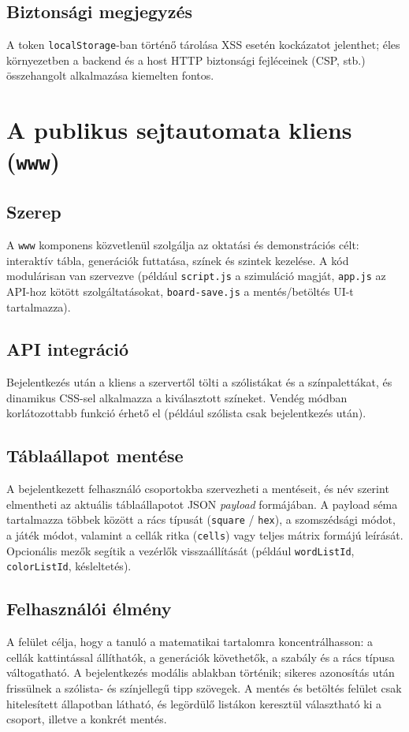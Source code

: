 \documentclass[12pt,a4paper,openany]{book}
\begin{document}
\section{Biztonsági megjegyzés}
A token \texttt{localStorage}-ban történő tárolása XSS esetén kockázatot jelenthet; éles környezetben a backend és a host HTTP biztonsági fejléceinek (CSP, stb.) összehangolt alkalmazása kiemelten fontos.

\chapter{A publikus sejtautomata kliens (\texttt{www})}
\label{ch:www}

\section{Szerep}
A \texttt{www} komponens közvetlenül szolgálja az oktatási és demonstrációs célt: interaktív tábla, generációk futtatása, színek és szintek kezelése. A kód modulárisan van szervezve (például \texttt{script.js} a szimuláció magját, \texttt{app.js} az API-hoz kötött szolgáltatásokat, \texttt{board-save.js} a mentés/betöltés UI-t tartalmazza).

\section{API integráció}
Bejelentkezés után a kliens a szervertől tölti a szólistákat és a színpalettákat, és dinamikus CSS-sel alkalmazza a kiválasztott színeket. Vendég módban korlátozottabb funkció érhető el (például szólista csak bejelentkezés után).

\section{Táblaállapot mentése}
A bejelentkezett felhasználó csoportokba szervezheti a mentéseit, és név szerint elmentheti az aktuális táblaállapotot JSON \emph{payload} formájában. A payload séma tartalmazza többek között a rács típusát (\texttt{square} / \texttt{hex}), a szomszédsági módot, a játék módot, valamint a cellák ritka (\texttt{cells}) vagy teljes mátrix formájú leírását. Opcionális mezők segítik a vezérlők visszaállítását (például \texttt{wordListId}, \texttt{colorListId}, késleltetés).

\section{Felhasználói élmény}
A felület célja, hogy a tanuló a matematikai tartalomra koncentrálhasson: a cellák kattintással állíthatók, a generációk követhetők, a szabály és a rács típusa váltogatható. A bejelentkezés modális ablakban történik; sikeres azonosítás után frissülnek a szólista- és színjellegű tipp szövegek. A mentés és betöltés felület csak hitelesített állapotban látható, és legördülő listákon keresztül választható ki a csoport, illetve a konkrét mentés.
\end{document}
